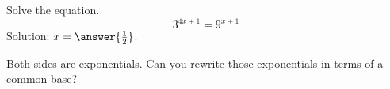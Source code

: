 \documentclass{ximera}
\author{Bobby Ramsey}
\begin{document}
\begin{exercise}
	Solve the equation.
	\[ 3^{4x+1} = 9^{x+1} \]
	Solution: $x = \answer{\frac{1}{2}}$.
	\begin{hint}
		Both sides are exponentials.  Can you rewrite those exponentials in terms of a common base?
	\end{hint}
\end{exercise}
\end{document}
